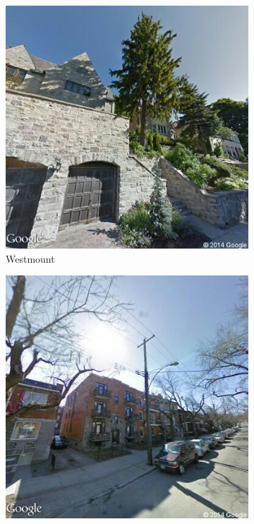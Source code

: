 \documentclass{acm_proc_article-sp}
\begin{document}
\begin{figure}[h!]
	\begin{subfigure}[b]{0.3\linewidth}
		\includegraphics[width=\linewidth]{westmount.png}
		\caption{Westmount}
		\label{fig:westmount}
	\end{subfigure}
	\begin{subfigure}[b]{0.3\linewidth}
		\includegraphics[width=\linewidth]{hochelaga.png}

\end{subfigure}
\end{figure}
\end{document}
